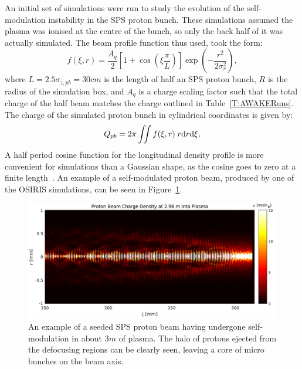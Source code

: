 An initial set of simulations were run to study the evolution of the self-modulation instability in the SPS proton bunch.
These simulations assumed the plasma was ionised at the centre of the bunch, so only the back half of it was actually simulated.
The beam profile function thus used, took the form:
\begin{equation}
    f(\xi,r) = \frac{A_{q}}{2} \left[1 + \cos\left(\xi\frac{\pi}{L}\right)\right] \exp\left(-\frac{r^{2}}{2\sigma_{r}^{2}}\right), \label{EQ:SPS-Profile}
\end{equation}
where $L = 2.5\sigma_{z,pb} = 30\unit{cm}$ is the length of half an SPS proton bunch, $R$ is the radius of the simulation box, and $A_{q}$ is a charge scaling factor such that the total charge of the half beam matches the charge outlined in Table~\ref{T:AWAKERuns}.
The charge of the simulated proton bunch in cylindrical coordinates is given by:
\begin{equation}
    Q_{pb} = 2\pi \iint f(\xi,r) \;r \mathrm{d} r \mathrm{d} \xi, \label{EQ:SPS-Charge}
\end{equation}
A half period cosine function for the longitudinal density profile is more convenient for simulations than a Gaussian shape, as the cosine goes to zero at a finite length~\cite{lotov:2010}.
An example of a self-modulated proton beam, produced by one of the OSIRIS simulations, can be seen in Figure~\ref{Fig:Sim:SMI}.

\begin{figure}[hbt]
    \centering
    \includegraphics[width=1.0\linewidth]{figures/PBSelfModulation}
    \caption{\label{Fig:Sim:SMI} An example of a seeded SPS proton beam having undergone self-modulation in about $3\unit{m}$ of plasma. The halo of protons ejected from the defocusing regions can be clearly seen, leaving a core of micro bunches on the beam axis.}
\end{figure}


